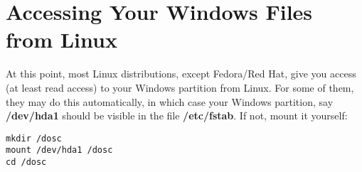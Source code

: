 \documentclass[11pt]{article}
\begin{document}
% 
% 
% 
% 
% 
% 
% 
% 
% 
% 

\section{Accessing Your Windows Files from Linux}  
\label{access}

At this point, most Linux distributions, except Fedora/Red Hat, give you
access (at least read access) to your Windows partition from Linux.  For
some of them, they may do this automatically, in which case your Windows
partition, say {\bf /dev/hda1} should be visible in the file {\bf
/etc/fstab}.  If not, mount it yourself:  

\begin{Verbatim}[fontsize=\relsize{-2}]
mkdir /dosc
mount /dev/hda1 /dosc
cd /dosc
\end{Verbatim}
\end{document}
